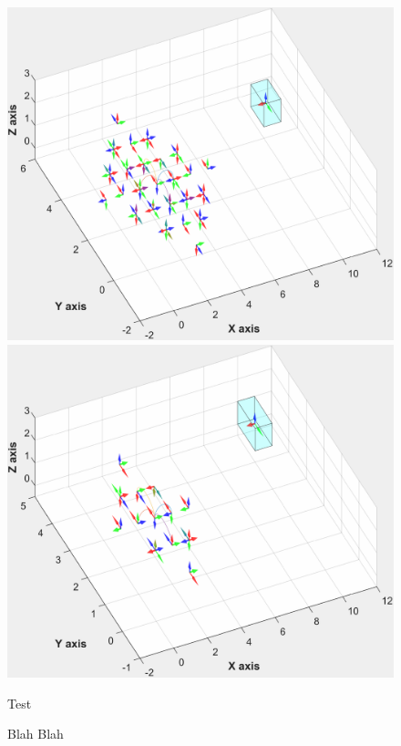 \documentclass[a4paper]{article}
\begin{document}
%
\tableofcontents
\thispagestyle{empty}
\clearpage

\setcounter{page}{1}










\newpage
\begin{center}
\begin{figure}[ht]
  \includegraphics[page=1,width=.5\textwidth]{image/test44.pdf}
  \includegraphics[page=1,width=.5\textwidth]{image/test43.pdf}
  \caption{Test}
  \label{fig:Test}
\end{figure}
\end{center}

\begin{center}
\begin{figure}[h]
\hfill
{}
\caption{Blah Blah}
\end{figure}
\end{center}
\end{document}

